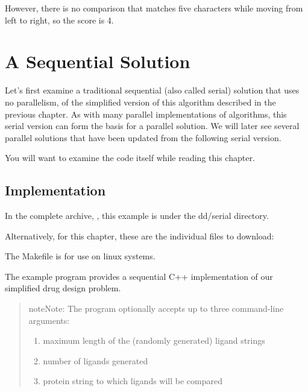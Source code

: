 \documentclass[letterpaper,10pt,openany,oneside]{sphinxmanual}
\begin{document}
However, there is no comparison that matches five characters while moving from left to right, so the score is 4.


\section{A Sequential Solution}
\label{sequentialimplementation/sequentialimplementation:a-sequential-solution}\label{sequentialimplementation/sequentialimplementation::doc}\label{sequentialimplementation/sequentialimplementation:folding-home}
Let's first examine a traditional sequential (also called serial) solution that uses no parallelism, of the simplified version of this algorithm described in the previous chapter. As with many parallel implementations of algorithms, this serial version can form the basis for a parallel solution. We will later see several parallel solutions that have been updated from the following serial version.

You will want to examine the code itself while reading this chapter.


\subsection{Implementation}
\label{sequentialimplementation/sequentialimplementation:implementation}
In the complete archive, , this example is under the dd/serial directory.

Alternatively, for this chapter, these are the individual files to download:



The Makefile is for use on linux systems.

The example program  provides a sequential C++ implementation of our simplified drug design problem.
\begin{quote}

\begin{notice}{note}{Note:}
The program optionally accepts up to three command-line arguments:
\begin{enumerate}
\item {} 
maximum length of the (randomly generated) ligand strings

\item {} 
number of ligands generated

\item {} 
protein string to which ligands will be compared

\end{enumerate}
\end{notice}
\end{quote}
\end{document}
